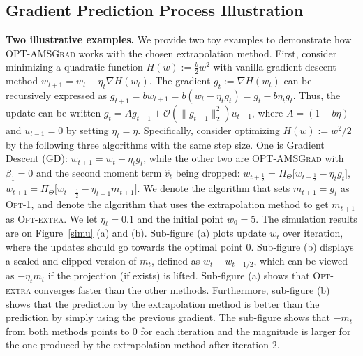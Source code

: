 \documentclass[wcp]{jmlr}
\begin{document}
\subsection{Gradient Prediction Process Illustration}


\textbf{Two illustrative examples.}\hspace{0.1in} 
We provide two toy examples to demonstrate how \textsc{OPT-AMSGrad} works with the chosen extrapolation method. 
First, consider minimizing a quadratic function $H(w) := \frac{b}{2} w^2 $ with vanilla gradient descent method $w_{t+1} = w_t - \eta_t \nabla H(w_t)$. 
The gradient $g_{t}:= \nabla H(w_{t})$ can be recursively expressed as  $g_{t+1} = b w_{t+1} = b ( w_t  - \eta_t g_t ) = g_t - b \eta_t g_t  $.
Thus, the update can be written $g_t = A g_{t-1}  + \mathcal{O}( \| g_{t-1} \|_2^2 ) u_{t-1}$, where $A = (1 - b \eta)$ and $u_{t-1}=0$ by setting $\eta_t=\eta$.
Specifically, consider optimizing $H(w) := w^2/2 $ by the following three algorithms with the same step size.
One is Gradient Descent (GD): $w_{t+1} = w_t - \eta_t g_t$, while the other two are \textsc{OPT-AMSGrad} with $\beta_1=0$ and the second moment term $\hat{v}_t$ being dropped: $w_{t+\frac{1}{2}} = \Pi_{\Theta}\big[ w_{t-\frac{1}{2}} - \eta_t g_t \big]$, $w_{t+1} = \Pi_{\Theta}\big[ w_{t+\frac{1}{2}} - \eta_{t+1} m_{t+1} \big]$. 
We denote the algorithm that sets $m_{t+1}= g_t$ as \textsc{Opt-1}, and denote the algorithm that uses the extrapolation method to get $m_{t+1}$ as \textsc{Opt-extra}.
We let $\eta_t=0.1$ and the initial point $w_0=5$.
The simulation results are on Figure~\ref{simu} (a) and (b). 
Sub-figure (a) plots update $w_t$ over iteration, where the updates should go towards the optimal point $0$.
Sub-figure (b) displays a scaled and clipped version of $m_t$, defined as $w_t - w_{t-1/2}$, which can be viewed as $- \eta_t m_{t}$ if the projection (if exists) is lifted.
Sub-figure (a) shows that \textsc{Opt-extra} converges faster than the other methods. 
Furthermore, sub-figure (b) shows that the prediction by the extrapolation method is better than the prediction by simply using the previous gradient. 
The sub-figure shows that $-m_t$ from both methods points to $0$ for each iteration and the magnitude is larger for the one produced by the extrapolation method after iteration $2$. 
\end{document}
